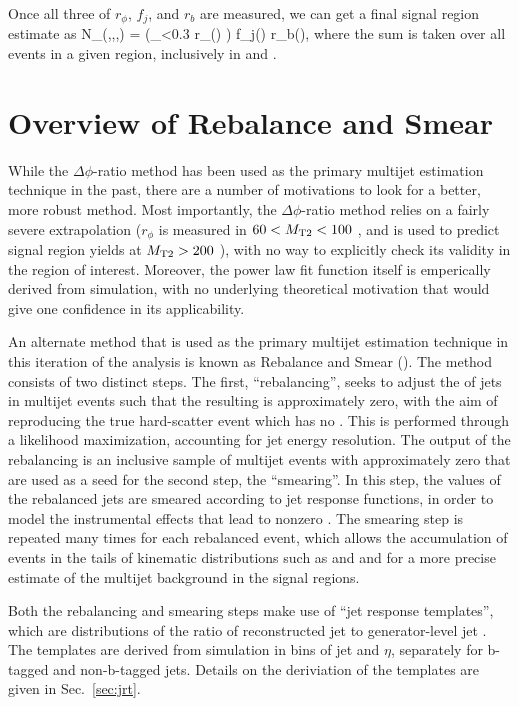 Once all three of $r_\phi$, $f_j$, and $r_b$ are measured, we can get a final
signal region estimate as
\be
N_(\Ht,\njets,\nbtags,\mttwo) = \left(\sum_{\dpmin<0.3} r_\phi(\mttwo) \right) \cdot f_j(\Ht) \cdot r_b(\njets),
\ee
where the sum is taken over all events in a given \Ht region, inclusively in \njets and \nbtags.

\section{Overview of Rebalance and Smear}

While the $\Delta\phi$-ratio method has been used as the primary multijet estimation technique
in the past, there are a number of motivations to look for a better, more robust method.
Most importantly, the $\Delta\phi$-ratio method relies on a fairly severe extrapolation 
($r_\phi$ is measured in $60 < M_{\mathrm{T2}} < 100$ \GeV, and is used to predict signal region 
yields at $M_{\mathrm{T2}}>200$ \GeV), with no way to explicitly check its validity in the 
region of interest. Moreover, the power law fit function itself is emperically derived
from simulation, with no underlying theoretical motivation that would give one confidence
in its applicability.

An alternate method that is used as the primary multijet estimation technique in this 
iteration of the analysis is known as Rebalance and Smear (\rs).
The method consists of two distinct steps. The first, ``rebalancing'', seeks to adjust
the \pt of jets in multijet events such that the resulting \ptmiss is approximately zero,
with the aim of reproducing the true hard-scatter event which has no \ptmiss.
This is performed through a likelihood maximization, accounting for jet energy resolution.
The output of the rebalancing is an inclusive sample of multijet events with approximately
zero \ptmiss that are used as a seed for the second step, the ``smearing''. In this step, the
\pt values of the rebalanced jets are smeared according to jet response functions, in order
to model the instrumental effects that lead to nonzero \ptmiss. The smearing step is repeated many
times for each rebalanced event, which allows the accumulation of events in the tails
of kinematic distributions such as \ptmiss and \mttwo and for a more precise estimate 
of the multijet background in the signal regions.

Both the rebalancing and smearing steps make use of ``jet response templates'', which are distributions
of the ratio of reconstructed jet \pt to generator-level jet \pt. The templates are derived from simulation
in bins of jet \pt and $\eta$, separately for b-tagged and non-b-tagged jets. Details on the deriviation
of the templates are given in Sec.~\ref{sec:jrt}.

